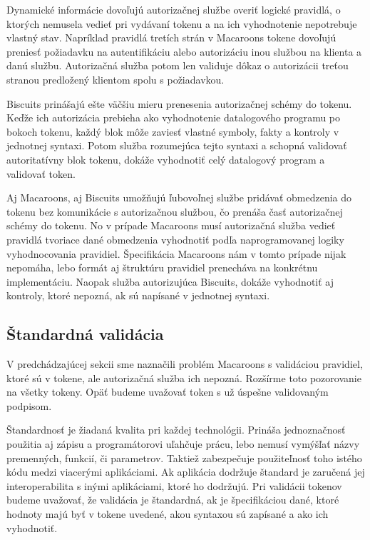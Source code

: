 Dynamické informácie dovoľujú autorizačnej službe overiť logické pravidlá, o ktorých nemusela vedieť pri vydávaní tokenu a na ich vyhodnotenie nepotrebuje vlastný stav. Napríklad pravidlá tretích strán v Macaroons tokene dovoľujú preniesť požiadavku na autentifikáciu alebo autorizáciu inou službou na klienta a danú službu. Autorizačná služba potom len validuje dôkaz o autorizácii treťou stranou predložený klientom spolu s požiadavkou.

Biscuits prinášajú ešte väčšiu mieru prenesenia autorizačnej schémy do tokenu. Keďže ich autorizácia prebieha ako vyhodnotenie datalogového programu po bokoch tokenu, každý blok môže zaviesť vlastné symboly, fakty a kontroly v jednotnej syntaxi. Potom služba rozumejúca tejto syntaxi a schopná validovať autoritatívny blok tokenu, dokáže vyhodnotiť celý datalogový program a validovať token.

Aj Macaroons, aj Biscuits umožňujú ľubovoľnej službe pridávať obmedzenia do tokenu bez komunikácie s autorizačnou službou, čo prenáša časť autorizačnej schémy do tokenu. No v prípade Macaroons musí autorizačná služba vedieť pravidlá tvoriace dané obmedzenia vyhodnotiť podľa naprogramovanej logiky vyhodnocovania pravidiel. Špecifikácia Macaroons \cite{macaroons_paper} nám v tomto prípade nijak nepomáha, lebo formát aj štruktúru pravidiel prenecháva na konkrétnu implementáciu. Naopak služba autorizujúca Biscuits, dokáže vyhodnotiť aj kontroly, ktoré nepozná, ak sú napísané v jednotnej syntaxi.

\subsection{Štandardná validácia}

V predchádzajúcej sekcii sme naznačili problém Macaroons s validáciou pravidiel, ktoré sú v tokene, ale autorizačná služba ich nepozná. Rozšírme toto pozorovanie na všetky tokeny. Opäť budeme uvažovať token s už úspešne validovaným podpisom.

Štandardnosť je žiadaná kvalita pri každej technológii. Prináša jednoznačnosť použitia aj zápisu a programátorovi uľahčuje prácu, lebo nemusí vymýšľať názvy premenných, funkcií, či parametrov. Taktiež zabezpečuje použiteľnosť toho istého kódu medzi viacerými aplikáciami. Ak aplikácia dodržuje štandard je zaručená jej interoperabilita s inými aplikáciami, ktoré ho dodržujú. Pri validácii tokenov budeme uvažovať, že validácia je štandardná, ak je špecifikáciou dané, ktoré hodnoty majú byť v tokene uvedené, akou syntaxou sú zapísané a ako ich vyhodnotiť.

